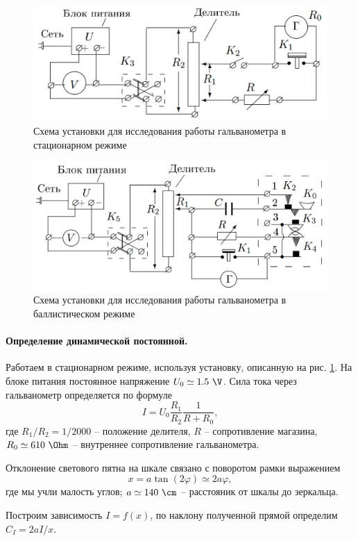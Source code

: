 \documentclass{../lab_class}
\begin{document}
\begin{figure}[H]
	\centering
	\includegraphics[width = 0.6 \textwidth]{scheme_st.png}
	\caption{Схема установки для исследования работы гальванометра в стационарном режиме}
	\label{fig:scheme_stat}
\end{figure}

\begin{figure}[H]
	\centering
	\includegraphics[width = 0.6 \textwidth]{scheme_ball.png}
	\caption{Схема установки для исследования работы гальванометра в баллистическом режиме}
	\label{fig:scheme_ball}
\end{figure}

\paragraph{Определение динамической постоянной.}
Работаем в стационарном режиме, используя установку, описанную на рис. \ref{fig:scheme_stat}. На блоке питания постоянное напряжение $U_0 \simeq 1.5 \ \V$. Сила тока через гальванометр определяется по формуле
\begin{equation*}
	I = U_0 \frac{R_1}{R_2} \frac{1}{R+R_0}, 
\end{equation*}
где $R_1/R_2 = 1/2000$ -- положение делителя, $R$ -- сопротивление магазина, $R_0 \simeq 610 \ \Ohm$ -- внутреннее сопротивление гальванометра. 

Отклонение светового пятна на шкале связано с поворотом рамки выражением
\begin{equation*}
	x = a \tan(2\varphi) \simeq 2 a \varphi,
\end{equation*}
где мы учли малость углов; $a \simeq 140 \ \cm$ -- расстояник от шкалы до зеркальца.

Построим зависимость $I = f(x)$, по наклону полученной прямой определим $C_I = 2aI/x$. 
\end{document}

